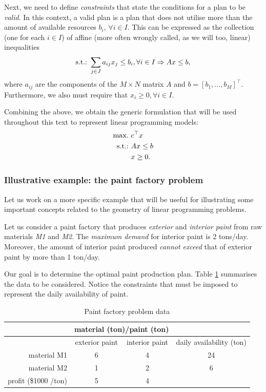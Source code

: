 Next, we need to define \emph{constraints} that state the conditions for a plan to be \emph{valid}. In this context, a valid plan is a plan that does not utilise more than the amount of available resources $b_i$, $\forall i \in I$. This can be expressed as the collection (one for each $i \in I$) of affine (more often wrongly called, as we will too, linear) inequalities
%
\begin{equation*}
	\mathop{\text{s.t.:~}} \sum_{j \in J} a_{ij}x_j \leq b_i, \forall i \in I	\Rightarrow	Ax \leq b,
\end{equation*}
%
where $a_{ij}$ are the components of the $M \times N$ matrix $A$ and $b = [b_1,\dots, b_M]^\top$. Furthermore, we also must require that $x_i \geq 0, \forall i \in I$.                                                                                                         

Combining the above, we obtain the generic formulation that will be used throughout this text to represent linear programming models:
%
\begin{align}
	\mathop{\text{max.~}} & c^\top x  \label{p1c1:eq:LP_objective} \\
	\mathop{\text{s.t.:~}}   & Ax \leq b \label{p1c1:eq:LP_constraint} \\
		  & x \geq 0. \label{p1c1:eq:LP_domain}
\end{align}
%


\subsubsection{Illustrative example: the paint factory problem \cite{taha2003operations}}
 
Let us work on a more specific example that will be useful for illustrating some important concepts related to the geometry of linear programming problems.

Let us consider a paint factory that produces \emph{exterior} and \emph{interior paint} from raw materials \emph{M1} and \emph{M2}. The \emph{maximum demand} for interior paint is 2 tons/day. Moreover, the amount of interior paint produced \emph{cannot exceed} that of exterior paint by more than 1 ton/day. 

Our goal is to determine the optimal paint production plan. Table \ref{p1c1:tab:paint_factory_problem_data} summarises the data to be considered. Notice the constraints that must be imposed to represent the daily availability of paint.

\begin{table}[h]
	\begin{tabular}{rccc} \hline
	&\multicolumn{2}{c}{material (ton)/paint (ton)}\\ \hline
	& exterior paint & interior paint & daily availability (ton)\\ \hline
	material M1 & 6 & 4 & 24\\
	material M2 & 1 & 2 & 6\\ \hline
	profit (\$1000 /ton) & 5 & 4\\ \hline
	\end{tabular}
	\caption{Paint factory problem data} \label{p1c1:tab:paint_factory_problem_data}
\end{table}

